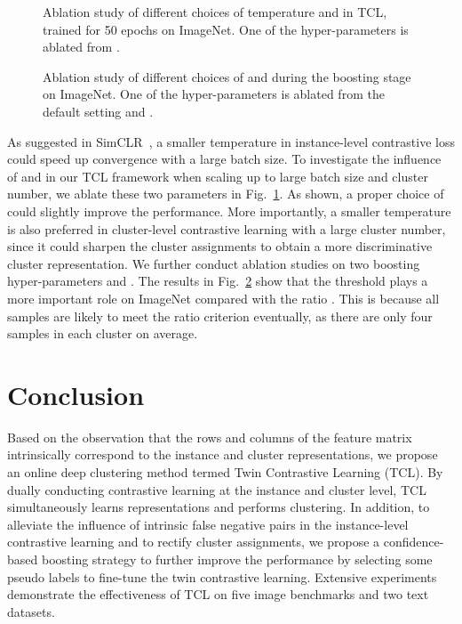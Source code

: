 \begin{figure}[h]\centering
  \caption{Ablation study of different choices of temperature  and  in TCL, trained for 50 epochs on ImageNet. One of the hyper-parameters is ablated from .}\label{fig:temperature}
\end{figure}

\begin{figure}[h]\centering
  \caption{Ablation study of different choices of  and  during the boosting stage on ImageNet. One of the hyper-parameters is ablated from the default setting  and .}\label{fig:alpha_gamma}
\end{figure}

As suggested in SimCLR~\citep{SimCLR}, a smaller temperature  in instance-level contrastive loss could speed up convergence with a large batch size. To investigate the influence of  and  in our TCL framework when scaling up to large batch size and cluster number, we ablate these two parameters in Fig.~\ref{fig:temperature}. As shown, a proper choice of  could slightly improve the performance. More importantly, a smaller temperature  is also preferred in cluster-level contrastive learning with a large cluster number, since it could sharpen the cluster assignments to obtain a more discriminative cluster representation. We further conduct ablation studies on two boosting hyper-parameters  and . The results in Fig.~\ref{fig:alpha_gamma} show that the threshold  plays a more important role on ImageNet compared with the ratio . This is because all samples are likely to meet the ratio criterion eventually, as there are only four samples in each cluster on average.

\section{Conclusion}

Based on the observation that the rows and columns of the feature matrix intrinsically correspond to the instance and cluster representations, we propose an online deep clustering method termed Twin Contrastive Learning (TCL). By dually conducting contrastive learning at the instance and cluster level, TCL simultaneously learns representations and performs clustering. In addition, to alleviate the influence of intrinsic false negative pairs in the instance-level contrastive learning and to rectify cluster assignments, we propose a confidence-based boosting strategy to further improve the performance by selecting some pseudo labels to fine-tune the twin contrastive learning. Extensive experiments demonstrate the effectiveness of TCL on five image benchmarks and two text datasets.

